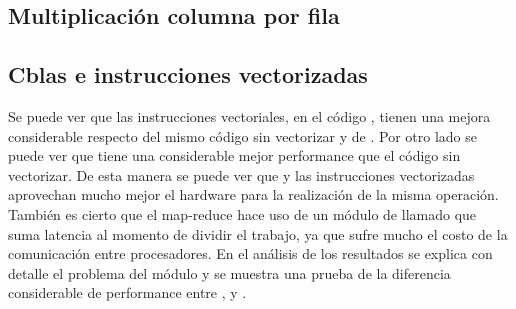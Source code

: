 \subsection{Multiplicación columna por fila}

    \def\model{ColumnByRow}
    \def\analisisAmdahl{
    Se puede observar que el speed up teórico tiende al máximo speed-up,
    mientras que el real nos muestra que no usa toda la paralelización, ya que al
    pasar de 1 a 2 threads el tiempo no cae a la mitad, y al pasar de 1 a 4 threads
    no cae a la cuarta parte. Se puede ver que tiene un speed-up de casi 2 lo
    cual quiere decir que hace uso de la mitad de la paralelización.
    }
    \def\analisisGustafson{
    Se puede ver que estos resultados demuestran que la sección serie del
    problema se mantiene casi constante respecto de la sección paralela,
    que varía en forma ascendente con el tamaño de los datos de entrada.
    Pero además se puede observar que hay mucha ineficiencia respecto del uso de
    la paralelización, ya que al aumentar el trabajo en casi el doble y usar
    dos procesadores debería tardar aproximadamente lo mismo. Sin embargo, vemos
    que el tiempo paralelo se duplicó, lo cual muestra que hay un problema de
    comunicación al aumentar el paralelismo. Más adelante se explicará que el
    módulo Pool es ineficiente respecto del uso de recursos.
    }
    
    \newpage
    \clearpage

\subsection{Cblas e instrucciones vectorizadas}
    \def\text{Tiempo serie de multiplicación en segundos}
    \def\path{dgemm.png}
    \def\scale{.6}
    

    Se puede ver que las instrucciones vectoriales, en el código
    , tienen una mejora considerable respecto del mismo
    código sin vectorizar y de . Por otro lado se puede ver que
     tiene una considerable mejor performance que el código
     sin vectorizar.
    De esta manera se puede ver que  y las instrucciones vectorizadas
    aprovechan mucho mejor el hardware para la realización de la misma operación.
    También es cierto que el map-reduce hace uso de un módulo de 
    llamado  que suma latencia al momento de dividir el trabajo, ya
    que sufre mucho el costo de la comunicación entre procesadores. En el análisis
    de los resultados se explica con detalle el problema del módulo 
    y se muestra una prueba de la diferencia considerable de performance entre
    ,  y .
